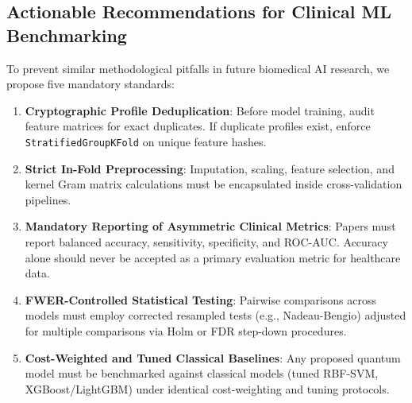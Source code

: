 \documentclass[journal,twocolumn]{IEEEtran}
\begin{document}
\subsection{Actionable Recommendations for Clinical ML Benchmarking}
To prevent similar methodological pitfalls in future biomedical AI research, we propose five mandatory standards:
\begin{enumerate}
    \item \textbf{Cryptographic Profile Deduplication}: Before model training, audit feature matrices for exact duplicates. If duplicate profiles exist, enforce \texttt{StratifiedGroupKFold} on unique feature hashes.
    \item \textbf{Strict In-Fold Preprocessing}: Imputation, scaling, feature selection, and kernel Gram matrix calculations must be encapsulated inside cross-validation pipelines.
    \item \textbf{Mandatory Reporting of Asymmetric Clinical Metrics}: Papers must report balanced accuracy, sensitivity, specificity, and ROC-AUC. Accuracy alone should never be accepted as a primary evaluation metric for healthcare data.
    \item \textbf{FWER-Controlled Statistical Testing}: Pairwise comparisons across models must employ corrected resampled tests (e.g., Nadeau-Bengio) adjusted for multiple comparisons via Holm or FDR step-down procedures.
    \item \textbf{Cost-Weighted and Tuned Classical Baselines}: Any proposed quantum model must be benchmarked against classical models (tuned RBF-SVM, XGBoost/LightGBM) under identical cost-weighting and tuning protocols.
\end{enumerate}

\end{document}
